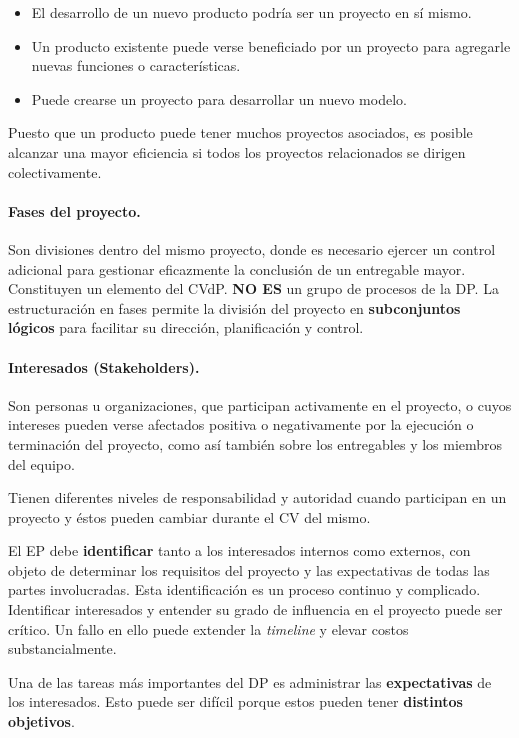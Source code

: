 \documentclass[10pt,a4paper]{article}
\begin{document}
\begin{itemize}
\item El desarrollo de un nuevo producto podría ser un proyecto en sí mismo.
\item Un producto existente puede verse beneficiado por un proyecto para agregarle nuevas funciones o características.
\item Puede crearse un proyecto para desarrollar un nuevo modelo.
\end{itemize}

Puesto que un producto puede tener muchos proyectos asociados, es posible alcanzar una mayor eficiencia si todos los proyectos relacionados se dirigen colectivamente.

\paragraph{Fases del proyecto.}
Son divisiones dentro del mismo proyecto, donde es necesario ejercer un control adicional para gestionar eficazmente la conclusión de un entregable mayor. Constituyen un elemento del CVdP. \textbf{NO ES} un grupo de procesos de la DP. La estructuración en fases permite la división del proyecto en \textbf{subconjuntos lógicos} para facilitar su dirección,
planificación y control.

\paragraph{Interesados (Stakeholders).}
Son personas u organizaciones, que participan activamente en el proyecto, o cuyos intereses pueden verse afectados positiva o negativamente por la ejecución o terminación del proyecto, como así también sobre los entregables y los miembros del equipo.

Tienen diferentes niveles de responsabilidad y autoridad cuando participan en un proyecto y éstos pueden cambiar durante el CV del mismo.

El EP debe \textbf{identificar} tanto a los interesados internos como externos, con objeto de determinar los requisitos del proyecto y las expectativas de todas las partes involucradas. Esta identificación es un proceso continuo y complicado. Identificar interesados y entender su grado de influencia en el proyecto puede ser crítico. Un fallo en ello puede extender la \textit{timeline} y elevar costos substancialmente.

Una de las tareas más importantes del DP es administrar las \textbf{expectativas} de los interesados. Esto puede ser difícil porque estos pueden tener \textbf{distintos objetivos}.
\end{document}
